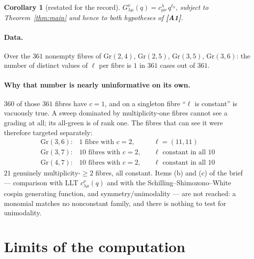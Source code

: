 \documentclass[11pt]{article}
\theoremstyle{plain}
\newtheorem{corollary}[theorem]{Corollary}
\theoremstyle{definition}
\begin{document}
\begin{corollary}[restated for the record]
$G^{\nu}_{\lambda\mu}(q)=c^{\lambda}_{\mu\nu}\,q^{\ell_0}$, subject to
Theorem~\ref{thm:main} and hence to \emph{both} hypotheses of \textbf{[A1]}.
\end{corollary}

\paragraph{Data.}  Over the $361$ nonempty fibres of $\mathrm{Gr}(2,4)$,
$\mathrm{Gr}(2,5)$, $\mathrm{Gr}(3,5)$, $\mathrm{Gr}(3,6)$: the number of distinct
values of $\ell$ per fibre is $1$ in $361$ cases out of $361$.

\paragraph{Why that number is nearly uninformative on its own.}  $360$ of those
$361$ fibres have $c=1$, and on a singleton fibre ``$\ell$ is constant'' is
vacuously true.  A sweep dominated by multiplicity-one fibres cannot see a grading at
all; its all-green is of rank one.  The fibres that can see it were therefore
targeted separately:
\[
\begin{array}{llll}
 \mathrm{Gr}(3,6): & 1 \text{ fibre with } c=2, &\quad \ell=(11,11)\\
 \mathrm{Gr}(3,7): & 10 \text{ fibres with } c=2, &\quad \ell \text{ constant in all } 10\\
 \mathrm{Gr}(4,7): & 10 \text{ fibres with } c=2, &\quad \ell \text{ constant in all } 10
\end{array}
\]
$21$ genuinely multiplicity-$\ge 2$ fibres, all constant.  Items (b) and (c) of the
brief --- comparison with LLT $c^{\nu}_{\lambda\mu}(q)$ and with the
Schilling--Shimozono--White cospin generating function, and symmetry/unimodality ---
are not reached: a monomial matches no nonconstant family, and there is nothing to
test for unimodality.

\section{Limits of the computation}\label{sec:limits}
\end{document}
